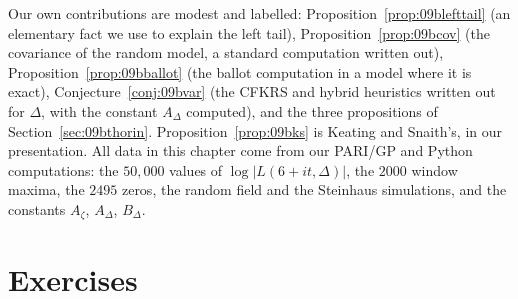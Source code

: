 Our own contributions are modest and labelled: Proposition~\ref{prop:09blefttail} (an elementary fact we use to explain the left tail), Proposition~\ref{prop:09bcov} (the covariance of the random model, a standard computation written out), Proposition~\ref{prop:09bballot} (the ballot computation in a model where it is exact), Conjecture~\ref{conj:09bvar} (the CFKRS and hybrid heuristics written out for $\Delta$, with the constant $A_\Delta$ computed), and the three propositions of Section~\ref{sec:09bthorin}. Proposition~\ref{prop:09bks} is Keating and Snaith's, in our presentation. All data in this chapter come from our PARI/GP and Python computations: the $50{,}000$ values of $\log|L(6+it,\Delta)|$, the $2000$ window maxima, the $2495$ zeros, the random field and the Steinhaus simulations, and the constants $A_\zeta$, $A_\Delta$, $B_\Delta$.

\section{Exercises}


